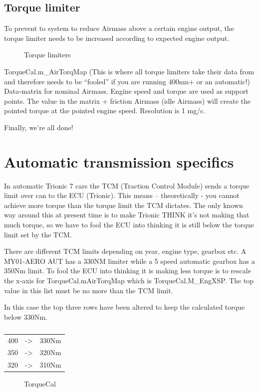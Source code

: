 \documentclass[11pt,a4paper]{book}
\newcommand{\Mfig}[1]{%
\begin{figure}[<+htpb+>]
    \centering
    \missingfigure{#1}
    \caption{#1}
\end{figure}}
\begin{document}
\section{Torque limiter}
To prevent to system to reduce Airmass above a certain engine output, the torque limiter needs to be
increased according to expected engine output.

\Mfig{Torque limiters}

TorqueCal.m\_AirTorqMap (This is where all torque limiters take their data from and therefore
needs to be \enquote{fooled} if you are running 400nm+ or an automatic!)
Data-matrix for nominal Airmass. Engine speed and torque are used as support points. The value in
the matrix + friction Airmass (idle Airmass) will create the pointed torque at the pointed engine speed.
Resolution is 1 mg/c.

Finally, we’re all done!

\chapter{Automatic transmission specifics}
In automatic Trionic 7 cars the TCM (Traction Control Module) sends a torque limit over can to the
ECU (Trionic). This means – theoretically - you cannot achieve more torque than the torque limit the
TCM dictates. The only known way around this at present time is to make Trionic THINK it’s not
making that much torque, so we have to fool the ECU into thinking it is still below the torque limit set
by the TCM.

There are different TCM limits depending on year, engine type, gearbox etc.
A MY01-AERO AUT has a 330NM limiter while a 5 speed automatic gearbox has a 350Nm limit.
To fool the ECU into thinking it is making less torque is to rescale the x-axis for
TorqueCal.mAirTorqMap which is TorqueCal.M\_EngXSP. The top value in this list must be no
more than the TCM limit.

In this case the top three rows have been altered to keep the calculated torque below 330Nm.

\begin{table}
    \centering
    \begin{tabular}{ccc}
        400 & -> & 330Nm\\
        350 &-> &320Nm\\
        320 &->& 310Nm
    \end{tabular}
    \caption{}
    \label{tab:}
\end{table}
\Mfig{TorqueCal}
\end{document}
